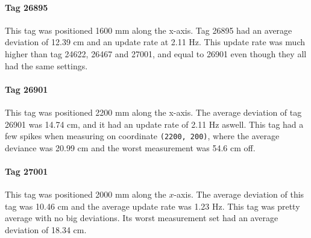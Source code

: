 \paragraph{Tag 26895}
This tag was positioned 1600 mm along the x-axis.
Tag 26895 had an average deviation of 12.39 cm and an update rate at 2.11 Hz. 
This update rate was much higher than tag 24622, 26467 and 27001, and equal to 26901 even though they all had the same settings.

\paragraph{Tag 26901}
This tag was positioned 2200 mm along the x-axis.
The average deviation of tag 26901 was 14.74 cm, and it had an update rate of 2.11 Hz aswell.
This tag had a few spikes when measuring on coordinate \texttt{(2200, 200)}, where the average deviance was 20.99 cm and the worst measurement was 54.6 cm off.

\paragraph{Tag 27001}
This tag was positioned 2000 mm along the $x$-axis.
The average deviation of this tag was 10.46 cm and the average update rate was 1.23 Hz.
This tag was pretty average with no big deviations.
Its worst measurement set had an average deviation of 18.34 cm.


